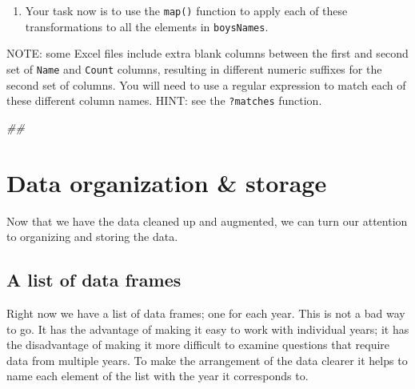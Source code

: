 \documentclass[]{book}
\newenvironment{Shaded}{\begin{snugshade}}{\end{snugshade}}
\newcommand{\CommentTok}[1]{\textcolor[rgb]{0.56,0.35,0.01}{\textit{#1}}}
\providecommand{\tightlist}{%
  \setlength{\itemsep}{0pt}\setlength{\parskip}{0pt}}
\begin{document}
\begin{enumerate}
\def\labelenumi{\arabic{enumi}.}
\setcounter{enumi}{1}
\tightlist
\item
  Your task now is to use the \texttt{map()} function to apply each of these
  transformations to all the elements in \texttt{boysNames}.
\end{enumerate}

NOTE: some Excel files include extra blank columns between the first and second
set of \texttt{Name} and \texttt{Count} columns, resulting in different numeric suffixes
for the second set of columns. You will need to use a regular expression
to match each of these different column names. HINT: see the \texttt{?matches}
function.

\begin{Shaded}
\begin{Highlighting}[]
\CommentTok{## }
\end{Highlighting}
\end{Shaded}

\hypertarget{data-organization-storage}{%
\section{Data organization \& storage}\label{data-organization-storage}}

Now that we have the data cleaned up and augmented, we can turn our attention to organizing and storing the data.

\hypertarget{a-list-of-data-frames}{%
\subsection{A list of data frames}\label{a-list-of-data-frames}}

Right now we have a list of data frames; one for each year. This is not a bad way to go. It has the advantage of making it easy to work with individual years; it has the disadvantage of making it more difficult to examine questions that require data from multiple years. To make the arrangement of the data clearer it helps to name each element of the list with the year it corresponds to.
\end{document}
